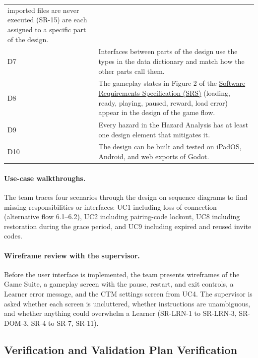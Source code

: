 \documentclass[12pt, titlepage]{article}
\newcommand{\srsref}[1]{#1}
\newcommand{\srsreq}[1]{#1}
\begin{document}
\begin{table}[htbp]
\begin{tabularx}{\textwidth}{l >{\raggedright\arraybackslash}X}
imported files are never executed (\srsreq{SR-15}) are each assigned to a specific
part of the design.\\
D7 & Interfaces between parts of the design use the types in the data
dictionary and match how the other parts call them.\\
D8 & The gameplay states in Figure 2 of the \href{https://github.com/meena-alomran/game-n-grow/blob/main/pdfs/SRS-IEEE/SRS.pdf}{Software Requirements Specification (SRS)} (loading, ready, playing,
paused, reward, load error) appear in the design of the game flow.\\
D9 & Every hazard in the Hazard Analysis has at least one design element that
mitigates it.\\
D10 & The design can be built and tested on iPadOS, Android, and web exports of
Godot.\\
\bottomrule
\end{tabularx}
\end{table}

\paragraph{Use-case walkthroughs.} The team traces four scenarios through the
design on sequence diagrams to find missing responsibilities or interfaces:
UC1 including loss of connection (alternative flow 6.1--6.2), UC2 including
pairing-code lockout, UC8 including restoration during the grace period, and
UC9 including expired and reused invite codes.

\paragraph{Wireframe review with the supervisor.} Before the user interface is
implemented, the team presents wireframes of the Game Suite, a gameplay screen
with the pause, restart, and exit controls, a Learner error message, and the
CTM settings screen from UC4. The supervisor is asked whether each screen is
uncluttered, whether instructions are unambiguous, and whether anything could
overwhelm a Learner (\srsref{SR-LRN-1} to \srsref{SR-LRN-3}, \srsref{SR-DOM-3}, \srsref{SR-4} to \srsref{SR-7}, \srsref{SR-11}).


\subsection{Verification and Validation Plan Verification}

\label{sec:plan-ver}
\end{document}
